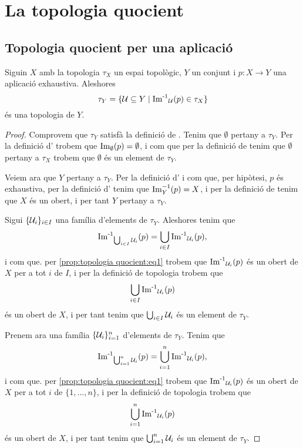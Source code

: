 \documentclass[../../Main.tex]{subfiles}
\begin{document}
\section{La topologia quocient}
	\subsection{Topologia quocient per una aplicació}
	\begin{proposition}
		\label{prop:topologia quocient}
		Siguin \(X\) amb la topologia \(\tau_{X}\) un espai topològic, \(Y\) un conjunt i \(p\colon X\longrightarrow Y\) una aplicació exhaustiva. Aleshores
		\begin{equation}
			\label{prop:topologia quocient:eq1}
			\tau_{Y}=\{\mathcal{U}\subseteq Y\mid\operatorname{\operatorname{Im}^{-1}}_{\mathcal{U}}(p)\in\tau_{X}\}
		\end{equation}
		és una topologia de \(Y\).
		\begin{proof} %
			Comprovem que \(\tau_{Y}\) satisfà la definició de . Tenim que \(\emptyset\) pertany a \(\tau_{Y}\). Per la definició d' trobem que \(\operatorname{Im}_{\emptyset}(p)=\emptyset\), i com que per la definició de  tenim que \(\emptyset\) pertany a \(\tau_{X}\) trobem que \(\emptyset\) és un element de \(\tau_{Y}\).
			
			Veiem ara que \(Y\) pertany a \(\tau_{Y}\). Per la definició d' i com que, per hipòtesi, \(p\) és exhaustiva, per la definició d' tenim que \(\operatorname{Im}_{Y}^{-1}(p)=X\), i per la definició de  tenim que \(X\) és un obert, i per tant \(Y\) pertany a \(\tau_{Y}\).
			
			Sigui \(\{\mathcal{U}_{i}\}_{i\in I}\) una família d'elements de \(\tau_{Y}\). Aleshores tenim que
			\[
			    \operatorname{\operatorname{Im}^{-1}}_{\bigcup_{i\in I}\mathcal{U}_{i}}(p)=\bigcup_{i\in I}\operatorname{\operatorname{Im}^{-1}}_{\mathcal{U}_{i}}(p),
			\]
			i com que. per \eqref{prop:topologia quocient:eq1} trobem que \(\operatorname{\operatorname{Im}^{-1}}_{\mathcal{U}_{i}}(p)\) és un obert de \(X\) per a tot \(i\) de \(I\), i per la definició de topologia trobem que
			\[
			    \bigcup_{i\in I}\operatorname{\operatorname{Im}^{-1}}_{\mathcal{U}_{i}}(p)
			\]
			és un obert de \(X\), i per tant tenim que \(\bigcup_{i\in I}\mathcal{U}_{i}\) és un element de \(\tau_{Y}\).
			
			Prenem ara una família \(\{\mathcal{U}_{i}\}_{i=1}^{n}\) d'elements de \(\tau_{Y}\). Tenim que
			\[
			    \operatorname{\operatorname{Im}^{-1}}_{\bigcup_{i=1}^{n}\mathcal{U}_{i}}(p)=\bigcup_{i=1}^{n}\operatorname{\operatorname{Im}^{-1}}_{\mathcal{U}_{i}}(p),
			\]
			i com que. per \eqref{prop:topologia quocient:eq1} trobem que \(\operatorname{\operatorname{Im}^{-1}}_{\mathcal{U}_{i}}(p)\) és un obert de \(X\) per a tot \(i\) de \(\{1,\dots,n\}\), i per la definició de topologia trobem que
			\[
			    \bigcup_{i=1}^{n}\operatorname{\operatorname{Im}^{-1}}_{\mathcal{U}_{i}}(p)
			\]
			és un obert de \(X\), i per tant tenim que \(\bigcup_{i=1}^{n}\mathcal{U}_{i}\) és un element de \(\tau_{Y}\).
		\end{proof}
	\end{proposition}
\end{document}

